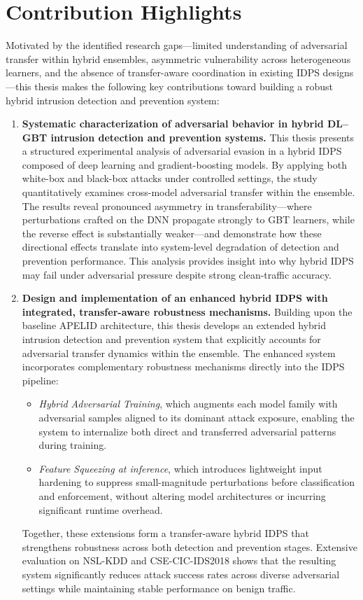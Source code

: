 \documentclass[12pt, a4paper, reqno, oneside]{book}
\newcommand \sect[1]{%
  \section*{#1}%
  \addcontentsline{toc}{section}{#1}}
\begin{document}
\sect{Contribution Highlights}
\label{sec:contribution}

Motivated by the identified research gaps---limited understanding of adversarial transfer within hybrid ensembles, asymmetric vulnerability across heterogeneous learners, and the absence of transfer-aware coordination in existing IDPS designs---this thesis makes the following key contributions toward building a robust hybrid intrusion detection and prevention system:

\begin{enumerate}
    \item \textbf{Systematic characterization of adversarial behavior in hybrid DL--GBT intrusion detection and prevention systems.} 
    This thesis presents a structured experimental analysis of adversarial evasion in a hybrid IDPS composed of deep learning and gradient-boosting models. By applying both white-box and black-box attacks under controlled settings, the study quantitatively examines cross-model adversarial transfer within the ensemble. The results reveal pronounced asymmetry in transferability---where perturbations crafted on the DNN propagate strongly to GBT learners, while the reverse effect is substantially weaker---and demonstrate how these directional effects translate into system-level degradation of detection and prevention performance. This analysis provides insight into why hybrid IDPS may fail under adversarial pressure despite strong clean-traffic accuracy.

    \item \textbf{Design and implementation of an enhanced hybrid IDPS with integrated, transfer-aware robustness mechanisms.}
    Building upon the baseline APELID architecture, this thesis develops an extended hybrid intrusion detection and prevention system that explicitly accounts for adversarial transfer dynamics within the ensemble. The enhanced system incorporates complementary robustness mechanisms directly into the IDPS pipeline:
    \begin{itemize}
        \item \textit{Hybrid Adversarial Training}, which augments each model family with adversarial samples aligned to its dominant attack exposure, enabling the system to internalize both direct and transferred adversarial patterns during training.
        \item \textit{Feature Squeezing at inference}, which introduces lightweight input hardening to suppress small-magnitude perturbations before classification and enforcement, without altering model architectures or incurring significant runtime overhead.
    \end{itemize}
    Together, these extensions form a transfer-aware hybrid IDPS that strengthens robustness across both detection and prevention stages. Extensive evaluation on NSL-KDD and CSE-CIC-IDS2018 shows that the resulting system significantly reduces attack success rates across diverse adversarial settings while maintaining stable performance on benign traffic.
\end{enumerate}
\end{document}
